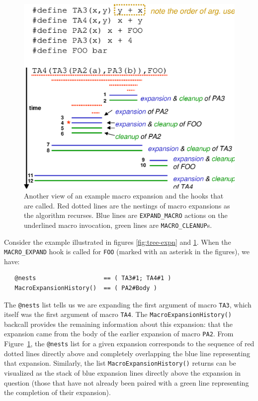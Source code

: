 \documentclass{article}
\newcommand{\figref}[1]{Figure~\ref{#1}}
\begin{document}
\begin{figure}[p]
  \begin{center}
    \leavevmode
    \includegraphics[width=0.45\linewidth]{text-expn.eps}
    \caption{Another view of an example macro expansion and the hooks
    that are called.  Red dotted lines are the nestings of macro
    expansions as the algorithm recurses.  Blue lines are
    \texttt{EXPAND\_MACRO} actions on the underlined macro invocation,
    green lines are \texttt{MACRO\_CLEANUP}s.}
    \label{fig:text-expn}
  \end{center}
\end{figure}

Consider the example illustrated in figures \ref{fig:tree-expn} and
\ref{fig:text-expn}.  When the \texttt{MACRO\_EXPAND} hook is called for
\texttt{FOO} (marked with an asterisk in the figures), we have:

\begin{verbatim}
   @nests                   == ( TA3#1; TA4#1 )
   MacroExpansionHistory()  == ( PA2#Body )
\end{verbatim}

\noindent The \texttt{@nests} list tells us we are expanding the first
argument of macro \texttt{TA3}, which itself was the first argument of
macro \texttt{TA4}.  The \texttt{MacroExpansionHistory()} backcall
provides the remaining information about this expansion: that the
expansion came from the body of the earlier expansion of macro
\texttt{PA2}.  From \figref{fig:text-expn}, the \texttt{@nests} list
for a given expansion corresponds to the sequence of red dotted lines
directly above and completely overlapping the blue line representing
that expansion.  Similarly, the list \texttt{MacroExpansionHistory()}
returns can be visualized as the stack of blue expansion
lines directly above the expansion in question (those that have not
already been paired with a green line representing the completion of
their expansion).  
\end{document}
